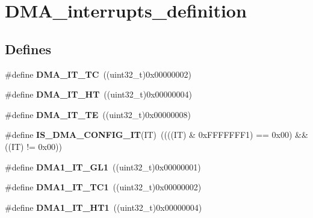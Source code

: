 \hypertarget{group__DMA__interrupts__definition}{
\section{DMA\_\-interrupts\_\-definition}
\label{group__DMA__interrupts__definition}
}
\subsection*{Defines}
\begin{DoxyCompactItemize}
\item 
\hypertarget{group__DMA__interrupts__definition_ga06e83dd277e0d3e5635cf8ce8dfd6e16}{
\#define {\bfseries DMA\_\-IT\_\-TC}~((uint32\_\-t)0x00000002)}
\label{group__DMA__interrupts__definition_ga06e83dd277e0d3e5635cf8ce8dfd6e16}

\item 
\hypertarget{group__DMA__interrupts__definition_gadf11c572b9797e04a14b105fdc2e5f66}{
\#define {\bfseries DMA\_\-IT\_\-HT}~((uint32\_\-t)0x00000004)}
\label{group__DMA__interrupts__definition_gadf11c572b9797e04a14b105fdc2e5f66}

\item 
\hypertarget{group__DMA__interrupts__definition_gaf9d92649d2a0146f663ff253d8f3b59e}{
\#define {\bfseries DMA\_\-IT\_\-TE}~((uint32\_\-t)0x00000008)}
\label{group__DMA__interrupts__definition_gaf9d92649d2a0146f663ff253d8f3b59e}

\item 
\hypertarget{group__DMA__interrupts__definition_ga47f6af7da302c19aba24516037d305e7}{
\#define {\bfseries IS\_\-DMA\_\-CONFIG\_\-IT}(IT)~((((IT) \& 0xFFFFFFF1) == 0x00) \&\& ((IT) != 0x00))}
\label{group__DMA__interrupts__definition_ga47f6af7da302c19aba24516037d305e7}

\item 
\hypertarget{group__DMA__interrupts__definition_ga017d35f4f6fbf5689ef39af7227bc5b0}{
\#define {\bfseries DMA1\_\-IT\_\-GL1}~((uint32\_\-t)0x00000001)}
\label{group__DMA__interrupts__definition_ga017d35f4f6fbf5689ef39af7227bc5b0}

\item 
\hypertarget{group__DMA__interrupts__definition_ga783532083dcc6e9752feb2e982ce7426}{
\#define {\bfseries DMA1\_\-IT\_\-TC1}~((uint32\_\-t)0x00000002)}
\label{group__DMA__interrupts__definition_ga783532083dcc6e9752feb2e982ce7426}

\item 
\hypertarget{group__DMA__interrupts__definition_gaea8c98e79c8cb420c81f7380a4c8e1da}{
\#define {\bfseries DMA1\_\-IT\_\-HT1}~((uint32\_\-t)0x00000004)}
\label{group__DMA__interrupts__definition_gaea8c98e79c8cb420c81f7380a4c8e1da}


\end{DoxyCompactItemize}
